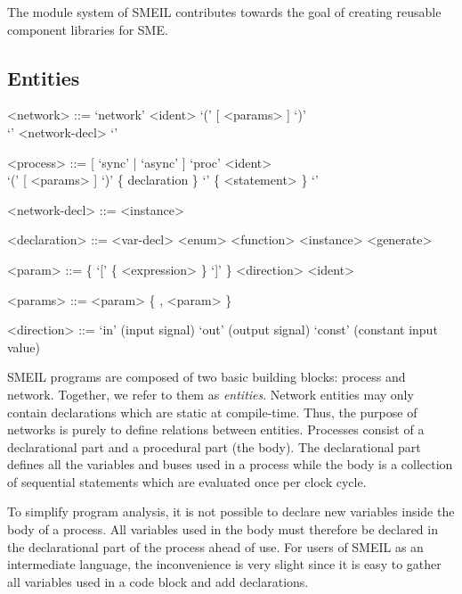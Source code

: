 The module system of SMEIL contributes towards the goal of creating reusable
component libraries for SME. 



\subsection{Entities}
\begin{grammar}
  <network> ::= `network' <ident> `(' [ <params> ] `)' \\`{' <network-decl> `}'

  <process> ::= [ `sync' | `async' ] `proc' <ident> \\ `(' [
             <params> ] `)' \{ declaration \} `{' \{ <statement> \} `}'

  <network-decl> ::= <instance>

  <declaration> ::= <var-decl>
  \alt <enum>
  \alt <function>
  \alt <instance>
  \alt <generate>
  
  <param> ::= \{ `[' \{ <expression> \} `]' \} <direction> <ident>

  <params> ::= <param> \{ , <param> \}

  <direction> ::= `in' (input signal)
  \alt `out' (output signal)
  \alt `const' (constant input value)  
\end{grammar}

SMEIL programs are composed of two basic building blocks: {\ttfamily
  process} and {\ttfamily network}. Together, we refer to them as {\itshape
  entities}. Network entities may only contain declarations which are static at
compile-time. Thus, the purpose of networks is purely to define relations
between entities.  Processes consist of a declarational part and a procedural
part (the body). The declarational part defines all the variables and buses used
in a process while the body is a collection of sequential statements which are
evaluated once per clock cycle.

To simplify program analysis, it is not possible to declare new variables inside
the body of a process. All variables used in the body must therefore be declared
in the declarational part of the process ahead of use.
For users of SMEIL as an intermediate
language, the inconvenience is very slight since it is easy to gather all
variables used in a code block and add declarations.

